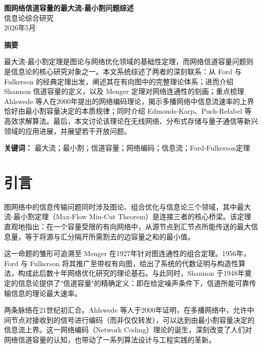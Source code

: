 \documentclass[12pt, a4paper]{article}
\begin{document}
\begin{center}
  {\LARGE\bfseries 图网络信道容量的最大流-最小割问题综述}\\[0.8em]
  {\large 信息论综合研究}\\[0.4em]
  {\normalsize 2026年5月}
\end{center}

\vspace{0.5em}

\begin{center}
  \textbf{摘\quad 要}
\end{center}

\noindent
最大流-最小割定理是图论与网络优化领域的基础性定理，而网络信道容量问题则是信息论的核心研究对象之一。本文系统综述了两者的深刻联系：从 Ford 与 Fulkerson 的经典定理出发，阐述其在有向图中的完整理论体系；进而介绍 Shannon 信道容量的定义，以及 Menger 定理对网络连通性的刻画；重点梳理 Ahlswede 等人在2000年提出的网络编码理论，揭示多播网络中信息流速率的上界恰好由最小割容量决定的本质规律；同时介绍 Edmonds-Karp、Push-Relabel 等高效求解算法。最后，本文讨论该理论在无线网络、分布式存储与量子通信等新兴领域的应用进展，并展望若干开放问题。

\noindent\textbf{关键词：} 最大流；最小割；信道容量；网络编码；信息流；Ford-Fulkerson定理

\vspace{1em}

\section{引\quad 言}

图网络中的信息传输问题同时涉及图论、组合优化与信息论三个领域，其中最大流-最小割定理（Max-Flow Min-Cut Theorem）是连接三者的核心桥梁。该定理直观地指出：在一个容量受限的有向网络中，从源节点到汇节点所能传送的最大信息量，等于将源与汇分隔开所需割去的边容量之和的最小值。

这一命题的雏形可追溯至 Menger 在1927年针对图连通性的组合定理\cite{menger1927}。1956年，Ford 与 Fulkerson 将其推广至带权有向图，给出了系统的代数证明与构造性算法\cite{ford1956maximal}，构成此后数十年网络优化研究的理论基石。与此同时，Shannon 于1948年奠定的信息论\cite{shannon1948mathematical}提供了"信道容量"的精确定义：即在给定噪声条件下，信道所能可靠传输信息的理论最大速率。

两条脉络在21世纪初汇合。Ahlswede 等人于2000年证明，在多播网络中，允许中间节点对接收到的信号进行编码（而非仅仅转发），可以达到由最小割容量决定的信息流上界\cite{ahlswede2000network}。这一网络编码（Network Coding）理论的诞生，深刻改变了人们对网络信道容量的认知，也带动了一系列算法设计与工程实践的革新。
\end{document}
